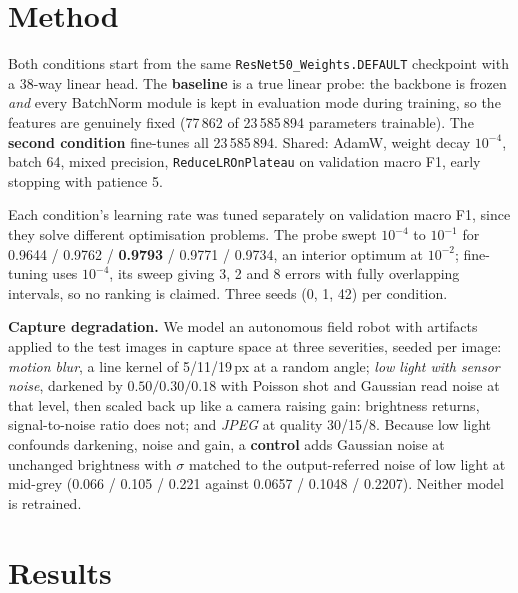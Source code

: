 \documentclass[10pt,a4paper,twocolumn]{article}
\begin{document}
\section{Method}

Both conditions start from the same \texttt{ResNet50\_Weights.DEFAULT} checkpoint with a 38-way
linear head. The \textbf{baseline} is a true linear probe: the backbone is frozen \emph{and} every
BatchNorm module is kept in evaluation mode during training, so the features are genuinely fixed
(77\,862 of 23\,585\,894 parameters trainable). The \textbf{second condition} fine-tunes all
23\,585\,894. Shared: AdamW, weight decay $10^{-4}$, batch 64, mixed precision,
\texttt{ReduceLROnPlateau} on validation macro F1, early stopping with patience 5.

Each condition's learning rate was tuned separately on validation macro F1, since they solve
different optimisation problems. The probe swept $10^{-4}$ to $10^{-1}$ for 0.9644 / 0.9762 /
\textbf{0.9793} / 0.9771 / 0.9734, an interior optimum at $10^{-2}$; fine-tuning uses $10^{-4}$, its
sweep giving 3, 2 and 8 errors with fully overlapping intervals, so no ranking is claimed. Three
seeds (0, 1, 42) per condition.

\textbf{Capture degradation.} We model an autonomous field robot with artifacts applied to the test
images in capture space at three severities, seeded per image: \emph{motion blur}, a line kernel of
5/11/19\,px at a random angle; \emph{low light with sensor noise}, darkened by $0.50/0.30/0.18$ with
Poisson shot and Gaussian read noise at that level, then scaled back up like a camera raising gain:
brightness returns, signal-to-noise ratio does not; and
\emph{JPEG} at quality 30/15/8. Because low light confounds darkening, noise and gain, a
\textbf{control} adds Gaussian noise at unchanged brightness with $\sigma$ matched to the
output-referred noise of low light at mid-grey (0.066 / 0.105 / 0.221 against 0.0657 / 0.1048 /
0.2207). Neither model is retrained.

\section{Results}
\end{document}
